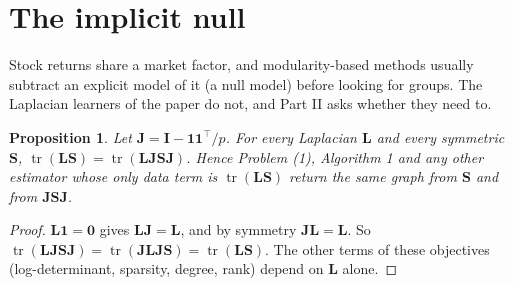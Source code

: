 \documentclass[11pt,a4paper]{article}
\newcommand{\Lap}{\mathbf{L}}
\newcommand{\Imat}{\mathbf{I}}
\newcommand{\Smat}{\mathbf{S}}
\newcommand{\one}{\mathbf{1}}
\newcommand{\tr}{\operatorname{tr}}
\newtheorem{proposition}{Proposition}
\theoremstyle{remark}
\begin{document}
\newcommand{\Jmat}{\mathbf J}
\newcommand{\bvec}{\mathbf b}
\newcommand{\wvec}{\mathbf w}
\newcommand{\zvec}{\mathbf z}

\section{The implicit null}\label{sec:implicit}

Stock returns share a market factor, and modularity-based methods usually subtract an
explicit model of it (a null model) before looking for groups. The Laplacian learners
of the paper do not, and Part II asks whether they need to.

\begin{proposition}\label{prop:implicit}
Let $\Jmat=\Imat-\one\one^\top/p$. For every Laplacian $\Lap$ and every symmetric
$\Smat$, $\tr(\Lap\Smat)=\tr(\Lap\Jmat\Smat\Jmat)$. Hence Problem (1), Algorithm 1 and
any other estimator whose only data term is $\tr(\Lap\Smat)$ return the same graph from
$\Smat$ and from $\Jmat\Smat\Jmat$.
\end{proposition}
\begin{proof}
$\Lap\one=\mathbf 0$ gives $\Lap\Jmat=\Lap$, and by symmetry $\Jmat\Lap=\Lap$. So
$\tr(\Lap\Jmat\Smat\Jmat)=\tr(\Jmat\Lap\Jmat\Smat)=\tr(\Lap\Smat)$. The other terms of
these objectives (log-determinant, sparsity, degree, rank) depend on $\Lap$ alone.
\end{proof}
\end{document}
